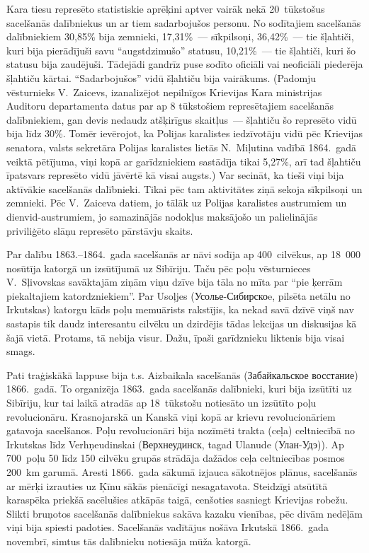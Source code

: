 \documentclass[twoside,a5paper,12pt,fleqn,openany]{extbook}
\newcommand{\rutxti}[1]{\textrussian{#1}}
\begin{document}
Kara tiesu represēto statistiskie aprēķini aptver vairāk nekā 20~tūkstošus sacelšanās dalībniekus un ar tiem sadarbojušos personu. No sodītajiem sacelšanās dalībniekiem 30,85\% bija zemnieki, 17,31\%~--- sīkpilsoņi, 36,42\%~--- tie šļahtiči, kuri bija pierādījuši savu ``augstdzimušo'' statusu, 10,21\%~--- tie šļahtiči, kuri šo statusu bija zaudējuši. Tādejādi gandrīz puse sodīto oficiāli vai neoficiāli piederēja šļahtiču kārtai. ``Sadarbojušos'' vidū šļahtiču bija vairākums. (Padomju vēsturnieks V.~Zaicevs, izanalizējot nepilnīgos Krievijas Kara ministrijas Auditoru departamenta datus par ap 8 tūkstošiem represētajiem sacelšanās dalībniekiem, gan devis nedaudz atšķirīgus skaitļus~--- šļahtiču šo represēto vidū bija līdz 30\%. Tomēr ievērojot, ka Polijas karalistes iedzīvotāju vidū pēc Krievijas senatora, valsts sekretāra Polijas karalistes lietās N.~Miļutina vadībā 1864.~gadā veiktā pētījuma, viņi kopā ar garīdzniekiem sastādīja tikai 5,27\%, arī tad šļahtiču īpatsvars represēto vidū jāvērtē kā visai augsts.) Var secināt, ka tieši viņi bija aktīvākie sacelšanās dalībnieki. Tikai pēc tam aktivitātes ziņā sekoja sīkpilsoņi un zemnieki. Pēc V.~Zaiceva datiem, jo tālāk uz Polijas karalistes austrumiem un dienvid-austrumiem, jo samazinājās nodokļus maksājošo un palielinājās priviliģēto slāņu represēto pārstāvju skaits.

Par dalību 1863.--1864.~gada sacelšanās ar nāvi sodīja ap 400~cilvēkus, ap 18~000 nosūtīja katorgā un izsūtījumā uz Sibīriju. Taču pēc poļu vēsturnieces V.~Sļivovskas savāktajām ziņām viņu dzīve bija tāla no mīta par ``pie ķerrām piekaltajiem katordzniekiem''. Par Usoļjes (\rutxti{Усолье-Сибирскоe}, pilsēta netālu no Irkutskas) katorgu kāds poļu memuārists rakstījis, ka nekad savā dzīvē viņš nav sastapis tik daudz interesantu cilvēku un dzirdējis tādas lekcijas un diskusijas kā šajā vietā. Protams, tā nebija visur. Dažu, īpaši garīdznieku liktenis bija visai smags.

Pati traģiskākā lappuse bija t.s. Aizbaikala sacelšanās (\rutxti{Забайкальское восстание}) 1866.~gadā. To organizēja 1863.~gada sacelšanās dalībnieki, kuri bija izsūtīti uz Sibīriju, kur tai laikā atradās ap 18~tūkstošu notiesāto un izsūtīto poļu revolucionāru. Krasnojarskā un Kanskā viņi kopā ar krievu revolucionāriem gatavoja sacelšanos. Poļu revolucionāri bija nozīmēti trakta (ceļa) celtniecībā no Irkutskas līdz Verhņeudinskai (\rutxti{Верхнеудинск}, tagad Ulanude (\rutxti{Улан-Удэ})). Ap 700~poļu 50 līdz 150 cilvēku grupās strādāja dažādos ceļa celtniecības posmos 200~km garumā. Aresti 1866.~gada sākumā izjauca sākotnējos plānus, sacelšanās ar mērķi izrauties uz Ķīnu sākās pienācīgi nesagatavota. Steidzīgi atsūtītā karaspēka priekšā sacēlušies atkāpās taigā, cenšoties sasniegt Krievijas robežu. Slikti bruņotos sacelšanās dalībniekus sakāva kazaku vienības, pēc divām nedēļām viņi bija spiesti padoties. Sacelšanās vadītājus nošāva Irkutskā 1866.~gada novembrī, simtus tās dalībnieku notiesāja mūža katorgā.
\end{document}
